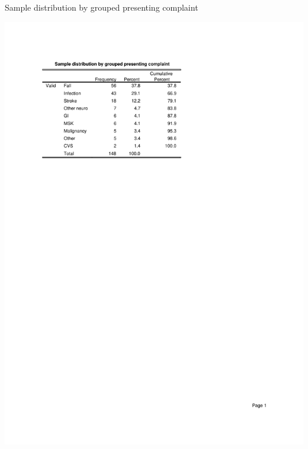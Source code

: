 \documentclass
[
	12pt,
	a4paper,
	oneside,
]{report}
\begin{document}
\begin{table}[ht]
\caption{Sample distribution by grouped presenting complaint}
\label{tab:pres-comp}
\includegraphics[width=\textwidth,
	trim={2.5cm 14cm 2.5cm 2.5cm},
	clip]{media/dist-pres-comp}
\end{table}
\end{document}
